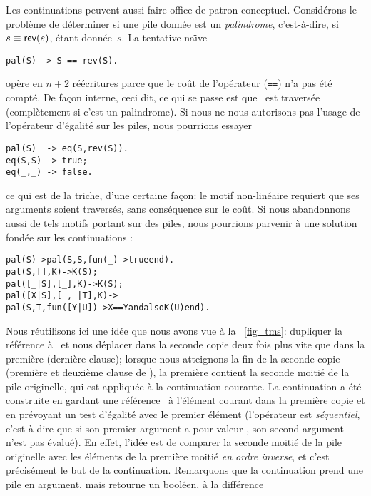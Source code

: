 Les continuations peuvent aussi faire office de patron
conceptuel. Considérons le problème de déterminer si une pile donnée
est un \emph{palindrome}, c'est-à-dire, si \(s
\equiv \textsf{rev}(s)\), étant donnée~\(s\). La tentative na\"{\i}ve
\begin{verbatim}
pal(S) -> S == rev(S).
\end{verbatim}
opère en \(n+2\) réécritures parce que le coût de l'opérateur
(\texttt{==}) n'a pas été compté. De façon interne, ceci dit, ce qui
se passe est que ~est traversée (complètement si c'est un
palindrome). Si nous ne nous autorisons pas l'usage de l'opérateur
d'égalité sur les piles, nous pourrions essayer
\begin{verbatim}
pal(S)  -> eq(S,rev(S)).
eq(S,S) -> true;
eq(_,_) -> false.
\end{verbatim}
ce qui est de la triche, d'une certaine façon: le motif non-linéaire
  requiert que ses arguments soient traversés, sans
conséquence sur le coût. Si nous abandonnons aussi de tels motifs
portant sur des piles, nous pourrions parvenir à une solution fondée
sur les continuations \citep{DanvyGoldberg_2001}:
\begin{alltt}
pal(S)               -> pal(S,S,fun(\_) -> true end).
pal(    S,     [],K) -> K(S);\hfill% \emph{Longueur paire}
pal([\_|S],    [\_],K) -> K(S);\hfill% \emph{Longueur impaire}
pal([X|S],[\_,\_|T],K) -> 
\hfill{}pal(S,T,fun([Y|U]) -> X == Y andalso K(U) end).
\end{alltt}
Nous réutilisons ici une idée que nous avons vue à la
\fig~\vref{fig_tms}: dupliquer la référence à~ et nous
déplacer dans la seconde copie deux fois plus vite que dans la
première (dernière clause); lorsque nous atteignons la fin de la
seconde copie (première et deuxième clause de ), la
première contient la seconde moitié de la pile originelle, qui est
appliquée à la continuation courante. La continuation a été construite
en gardant une référence~ à l'élément courant dans la
première copie et en prévoyant un test d'égalité avec le premier
élément (l'opérateur  est \emph{séquentiel},
c'est-à-dire que si son premier argument a pour valeur
, son second argument n'est pas évalué). En effet,
l'idée est de comparer la seconde moitié de la pile originelle avec
les éléments de la première moitié \emph{en ordre inverse}, et c'est
précisément le but de la continuation. Remarquons que la continuation
prend une pile en argument, mais retourne un booléen, à la différence
